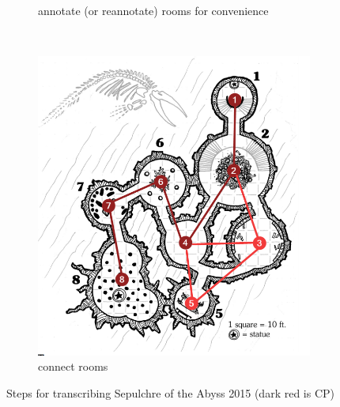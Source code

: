 \documentclass{UoYCSproject}
\begin{document}
\begin{figure}[htb]
\begin{subfigure}[b]{0.45\textwidth}
    \caption{annotate (or reannotate) rooms for convenience}
  \end{subfigure}
  ~
  \begin{subfigure}[b]{0.45\textwidth}
    \centering
    \includegraphics[width=\textwidth]{figures/step3.png}
    \caption{connect rooms}
  \end{subfigure}
  \caption{Steps for transcribing Sepulchre of the Abyss 2015 (dark red is CP)}
  \label{fig:SOTA}
\end{figure}
\end{document}
